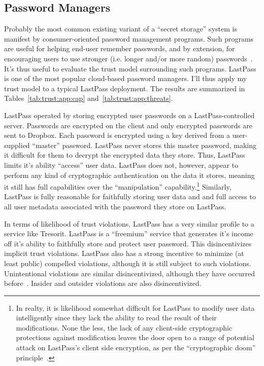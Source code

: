 \subsection{Password Managers}

Probably the most common existing variant of a ``secret storage''
system is manifest by consumer-oriented password management
programs. Such programs are useful for helping end-user remember
passwords, and by extension, for encouraging users to use stronger
(i.e. longer and/or more random) passwords~\cite{brodkin-passman,
  krebs-passwords, schneier-passwords}. It's thus useful to evaluate
the trust model surrounding such programs. LastPass~\cite{lastpass} is
one of the most popular cloud-based password managers. I'll thus apply
my trust model to a typical LastPass deployment. The results are
summarized in Tables~\ref{tab:trust:app:cap}
and~\ref{tab:trust:app:threats}.

LastPass operated by storing encrypted user passwords on a
LastPass-controlled server. Passwords are encrypted on the client and
only encrypted passwords are sent to Dropbox. Each password is
encrypted using a key derived from a user-supplied ``master''
password. LastPass never stores this master password, making it
difficult for them to decrypt the encrypted data they store. Thus,
LastPass limits it's ability ``access'' user data. LastPass does not,
however, appear to perform any kind of cryptographic authentication on
the data it stores, meaning it still has full capabilities over the
``manipulation'' capability.\footnote{In realty, it is likelihood
  somewhat difficult for LastPass to modify user data intelligently
  since they lack the ability to read the result of their
  modifications. None the less, the lack of any client-side
  cryptographic protections against modification leaves the door open
  to a range of potential attack on LastPass's client side encryption,
  as per the ``cryptographic doom''
  principle~\cite{marlinspike-doom}.}  Similarly, LastPass is fully
reasonable for faithfully storing user data and and full access to all
user metadata associated with the password they store on LastPass.

In terms of likelihood of trust violations, LastPass has a very
similar profile to a service like Tresorit. LastPass is a ``freemium''
service that generates it's income off it's ability to faithfully
store and protect user password. This disincentivizes implicit trust
violations. LastPass also has a strong incentive to minimize (at least
public) compelled violations, although it is still subject to such
violations. Unintentional violations are similar disincentivized,
although they have occurred
before~\cite{lastpass-blog-breach}. Insider and outsider violations
are also disincentivized.

